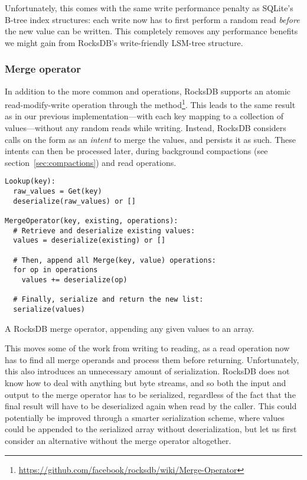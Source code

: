 Unfortunately, this comes with the same write performance penalty as SQLite's
B-tree index structures: each write now has to first perform a random read
\textit{before} the new value can be written. This completely removes any
performance benefits we might gain from RocksDB's write-friendly LSM-tree
structure.

\subsubsection{Merge operator}

In addition to the more common  and  operations, RocksDB
supports an atomic read-modify-write operation through the 
method\footnote{\url{https://github.com/facebook/rocksdb/wiki/Merge-Operator}}.
This leads to the same result as in our previous implementation---with each key
mapping to a collection of values---without any random reads while writing.
Instead, RocksDB considers calls on the form  as an
\textit{intent} to merge the values, and persists it as such. These intents can
then be processed later, during background compactions (see
section~\ref{sec:compactions}) and read operations.

\begin{listing}[H]
  \begin{verbatim}
Lookup(key):
  raw_values = Get(key)
  deserialize(raw_values) or []

MergeOperator(key, existing, operations):
  # Retrieve and deserialize existing values:
  values = deserialize(existing) or []

  # Then, append all Merge(key, value) operations:
  for op in operations
    values += deserialize(op)

  # Finally, serialize and return the new list:
  serialize(values)
  \end{verbatim}

  \caption{A RocksDB merge operator, appending any given values to an array.}\label{lst:merge-fn}
\end{listing}

This moves some of the work from writing to reading, as a read operation now has
to find all merge operands and process them before returning. Unfortunately,
this also introduces an unnecessary amount of serialization. RocksDB does not
know how to deal with anything but byte streams, and so both the input and
output to the merge operator has to be serialized, regardless of the fact that
the final result will have to be deserialized again when read by the caller.
This could potentially be improved through a smarter serialization scheme, where
values could be appended to the serialized array without deserialization, but
let us first consider an alternative without the merge operator altogether.

